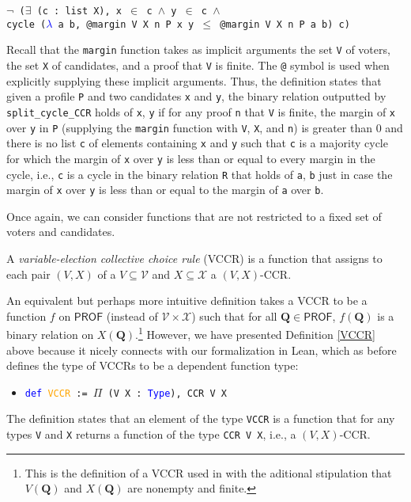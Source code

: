 \documentclass[runningheads]{llncs}
\begin{document}
\begin{example}
\begin{itemize}
    \texttt{$\neg$ ($\exists$ (c : list X), x $\in$ c $\wedge$ y $\in$ c $\wedge$}\\
    \texttt{cycle (\textcolor{blue}{$\lambda$} a b, @margin V X n P x y $\leq$ @margin V X n P a b) c)}
\end{itemize}
Recall that the \texttt{margin} function takes as implicit arguments the set \texttt{V} of voters, the set \texttt{X} of candidates, and a proof that \texttt{V} is finite. The \texttt{@} symbol is used when explicitly supplying these implicit arguments. Thus, the definition states that given a profile \texttt{P} and two candidates \texttt{x} and \texttt{y}, the binary relation outputted by \texttt{split\_cycle\_CCR} holds of \texttt{x}, \texttt{y} if for any proof \texttt{n} that \texttt{V} is finite, the margin of \texttt{x} over \texttt{y} in \texttt{P} (supplying the \texttt{margin} function with \texttt{V}, \texttt{X}, and \texttt{n}) is greater than 0 and there is no list \texttt{c} of elements containing \texttt{x} and \texttt{y} such that \texttt{c} is a majority cycle for which the margin of \texttt{x} over \texttt{y} is less than or equal to every margin in the cycle, i.e., \texttt{c} is a cycle in the binary relation \texttt{R} that holds of \texttt{a}, \texttt{b} just in case the margin of \texttt{x} over \texttt{y} is less than or equal to the margin of \texttt{a} over \texttt{b}.

\end{example}

Once again, we can consider functions that are not restricted to a fixed set of voters and candidates.

\begin{definition}\label{VCCR} \textnormal{A \emph{variable-election collective choice rule} (VCCR) is a function that assigns to each pair $(V,X)$ of a $V\subseteq\mathcal{V}$ and $X\subseteq\mathcal{X}$ a $(V,X)$-CCR.}%
\end{definition}

\noindent An equivalent but perhaps more intuitive definition takes a VCCR to be a function $f$ on $\mathsf{PROF}$ (instead of $\mathcal{V}\times\mathcal{X}$) such that for all $\mathbf{Q}\in\mathsf{PROF}$, $f(\mathbf{Q})$ is a binary relation on $X(\mathbf{Q})$.\footnote{This is the definition of a VCCR used in \cite{HP2020} with the aditional stipulation that $V(\mathbf{Q})$ and $X(\mathbf{Q})$ are nonempty and finite.} However, we have presented Definition \ref{VCCR} above because it nicely connects with our formalization in Lean, which as before defines the type of VCCRs to be a dependent function type:
\begin{itemize}
\item[] \texttt{\textcolor{blue}{def} \textcolor{orange}{VCCR} := $\Pi$ (V X : \textcolor{blue}{Type}), CCR V X}
\end{itemize}
The definition states that an element of the type \texttt{VCCR} is a function that for any types \texttt{V} and \texttt{X} returns a function of the type \texttt{CCR V X}, i.e., a $(V,X)$-CCR.
\end{document}
